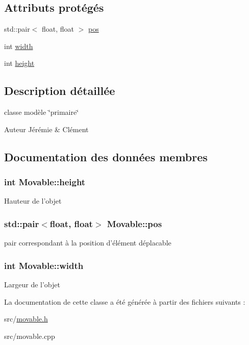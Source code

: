 \subsection*{Attributs protégés}
\begin{DoxyCompactItemize}
\item 
std\+::pair$<$ float, float $>$ \hyperlink{class_movable_a1193c385c2996257b7e7b7e486bd8f0e}{pos}
\item 
int \hyperlink{class_movable_a7e4607cccfcc96d2007c2e39c44cab54}{width}
\item 
int \hyperlink{class_movable_a192073065bc62d054f259c3b1522c09e}{height}
\end{DoxyCompactItemize}


\subsection{Description détaillée}
classe modèle \char`\"{}primaire\char`\"{} 

\begin{DoxyAuthor}{Auteur}
Jérémie \& Clément 
\end{DoxyAuthor}


\subsection{Documentation des données membres}
\hypertarget{class_movable_a192073065bc62d054f259c3b1522c09e}{
\subsubsection[{height}]{\setlength{\rightskip}{0pt plus 5cm}int Movable\+::height\hspace{0.3cm}{\ttfamily [protected]}}}\label{class_movable_a192073065bc62d054f259c3b1522c09e}
Hauteur de l'objet \hypertarget{class_movable_a1193c385c2996257b7e7b7e486bd8f0e}{
\subsubsection[{pos}]{\setlength{\rightskip}{0pt plus 5cm}std\+::pair$<$float, float$>$ Movable\+::pos\hspace{0.3cm}{\ttfamily [protected]}}}\label{class_movable_a1193c385c2996257b7e7b7e486bd8f0e}
pair correspondant à la position d'élément déplacable \hypertarget{class_movable_a7e4607cccfcc96d2007c2e39c44cab54}{
\subsubsection[{width}]{\setlength{\rightskip}{0pt plus 5cm}int Movable\+::width\hspace{0.3cm}{\ttfamily [protected]}}}\label{class_movable_a7e4607cccfcc96d2007c2e39c44cab54}
Largeur de l'objet 

La documentation de cette classe a été générée à partir des fichiers suivants \+:\begin{DoxyCompactItemize}
\item 
src/\hyperlink{movable_8h}{movable.\+h}\item 
src/movable.\+cpp\end{DoxyCompactItemize}

